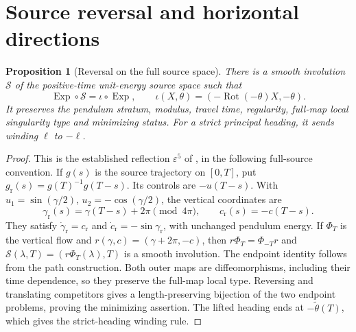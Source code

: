 \documentclass[11pt,a4paper]{article}
\newtheorem{proposition}[theorem]{Proposition}
\theoremstyle{remark}\newtheorem{remark}[theorem]{Remark}
\begin{document}
\section{Source reversal and horizontal directions}\label{sec:horizontal}

\begin{proposition}[Reversal on the full source space]\label{prop:reversal}
There is a smooth involution $\mathcal S$ of the positive-time unit-energy
source space such that
\[
 \operatorname{Exp}\circ\mathcal S=\iota\circ\operatorname{Exp},
 \qquad
 \iota(X,\theta)=(-\operatorname{Rot}(-\theta)X,-\theta).
\]
It preserves the pendulum stratum, modulus, travel time, regularity,
full-map local singularity type and minimizing status. For a strict
principal heading, it sends winding $\ell$ to $-\ell$.
\end{proposition}
\begin{proof}
This is the established reflection $\varepsilon^5$ of \cite{MS}, in the
following full-source convention. If $g(s)$ is the source trajectory on
$[0,T]$, put $g_{\mathrm r}(s)=g(T)^{-1}g(T-s)$. Its controls are
$-u(T-s)$. With $u_1=\sin(\gamma/2)$, $u_2=-\cos(\gamma/2)$, the vertical
coordinates are
\[
 \gamma_{\mathrm r}(s)=\gamma(T-s)+2\pi\pmod{4\pi},
 \qquad c_{\mathrm r}(s)=-c(T-s).
\]
They satisfy $\dot\gamma_{\mathrm r}=c_{\mathrm r}$ and
$\dot c_{\mathrm r}=-\sin\gamma_{\mathrm r}$, with unchanged pendulum
energy. If $\Phi_T$ is the vertical flow and
$r(\gamma,c)=(\gamma+2\pi,-c)$, then $r\Phi_T=\Phi_{-T}r$ and
$\mathcal S(\lambda,T)=(r\Phi_T(\lambda),T)$ is a smooth involution.
The endpoint identity follows from the path construction. Both outer
maps are diffeomorphisms, including their time dependence, so they
preserve the full-map local type. Reversing and translating competitors
gives a length-preserving bijection of the two endpoint problems, proving
the minimizing assertion. The lifted heading ends at
$-\widetilde\theta(T)$, which gives the strict-heading winding rule.
\end{proof}
\end{document}
